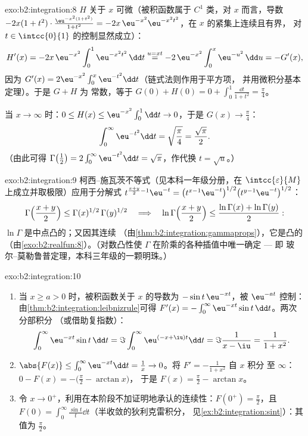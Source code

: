 \begin{solution}{exo:b2:integration:8}
$H$ 关于 $x$ 可微（被积函数属于 $C^1$ 类，对 $x$ 而言，导数
$-2x(1+t^2)\cdot\frac{\eu^{-x^2(1+t^2)}}{1+t^2} =
-2x\,\eu^{-x^2}\eu^{-x^2t^2}$，在 $x$ 的紧集上连续且有界，
对 $t \in \intcc{0}{1}$ 的控制显然成立）：
\[
H'(x) = -2x\,\eu^{-x^2}\int_0^1 \eu^{-x^2t^2}\,\dd t
\overset{u = xt}{=} -2\,\eu^{-x^2}\int_0^x \eu^{-u^2}\,\dd u
= -G'(x),
\]
因为 $G'(x) = 2\eu^{-x^2}\int_0^x \eu^{-t^2}\dd t$（链式法则作用于平方项，
并用微积分基本定理）。于是 $G + H$ 为
常数，等于 $G(0) + H(0) = 0 + \int_0^1 \frac{\dd t}{1+t^2}
= \frac\pi4$。

当 $x \to \infty$ 时：$0 \leq H(x) \leq \eu^{-x^2}\int_0^1 \dd t \to
0$，于是 $G(x) \to \frac\pi4$：
\[
\int_0^\infty \eu^{-t^2}\dd t = \sqrt{\frac\pi4} =
\frac{\sqrt\pi}{2} .
\]
（由此可得 $\Gamma\bigl(\frac12\bigr) = 2\int_0^\infty
\eu^{-t^2}\dd t = \sqrt\pi$，作代换 $t = \sqrt u$。）
\end{solution}

\begin{solution}{exo:b2:integration:9}
柯西--施瓦茨不等式（见本科一年级分册，在 $\intcc{\varepsilon}{M}$
上成立并取极限）应用于分解式
$t^{\frac{x+y}{2}-1}\eu^{-t} = \bigl(t^{x-1}\eu^{-t}\bigr)^{1/2}
\bigl(t^{y-1}\eu^{-t}\bigr)^{1/2}$：
\[
\Gamma\Bigl(\frac{x+y}{2}\Bigr) \leq
\Gamma(x)^{1/2}\,\Gamma(y)^{1/2}
\quad\Longrightarrow\quad
\ln\Gamma\Bigl(\frac{x+y}{2}\Bigr) \leq \frac{\ln\Gamma(x) +
\ln\Gamma(y)}{2} :
\]
$\ln\Gamma$ 是中点凸的；又因其连续
（由\cref{thm:b2:integration:gammaprops}），它是凸的
（由\cref{exo:b2:realfun:8}）。（对数凸性使 $\Gamma$
在阶乘的各种插值中唯一确定 --- 即
玻尔–莫勒鲁普定理，本科三年级的一颗明珠。）
\end{solution}

\begin{solution}{exo:b2:integration:10}
\begin{enumerate}
  \item 当 $x \geq a > 0$ 时，被积函数关于 $x$ 的导数为
        $-\sin t\,\eu^{-xt}$，被 $\eu^{-at}$ 控制：
        由\cref{thm:b2:integration:leibnizrule}可得 $F'(x) =
        -\int_0^\infty \eu^{-xt}\sin t\,\dd t$。两次分部积分
        （或借助复指数）：
        \[
        \int_0^\infty \eu^{-xt}\sin t\,\dd t
        = \Im \int_0^\infty \eu^{(-x+\iu)t}\dd t
        = \Im\frac{1}{x - \iu} = \frac{1}{1 + x^2} .
        \]
  \item $\abs{F(x)} \leq \int_0^\infty \eu^{-xt}\dd t = \frac1x \to
        0$。将 $F' = -\frac{1}{1+x^2}$ 自 $x$ 积分
        至 $\infty$：$0 - F(x) = -\bigl(\frac\pi2 - \arctan x\bigr)$，
        于是 $F(x) = \frac\pi2 - \arctan x$。
  \item 令 $x \to 0^+$，利用在本阶段不加证明地承认的连续性：$F(0^+) =
        \frac\pi2$，且 $F(0) = \int_0^\infty \frac{\sin t}{t}\dd
        t$（半收敛的狄利克雷积分，
        见\cref{ex:b2:integration:sint}）：其值为
        $\frac\pi2$。
\end{enumerate}
\end{solution}

